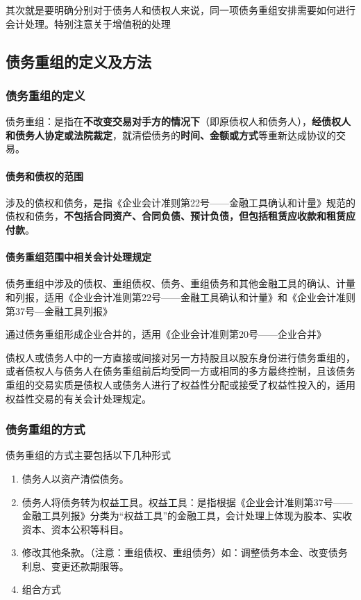 \documentclass[UTF8,12pt]{ctexart}
\numberwithin{equation}{section} %
\numberwithin{figure}{section}
\numberwithin{table}{section}
\begin{document}
	其次就是要明确分别对于债务人和债权人来说，同一项债务重组安排需要如何进行会计处理。特别注意关于增值税的处理
	
	\subsection{债务重组的定义及方法}
	\subsubsection{债务重组的定义}
	债务重组：是指在\textbf{不改变交易对手方的情况下}（即原债权人和债务人），\textbf{经债权人和债务人协定或法院裁定}，就清偿债务的\textbf{时间、金额或方式}等重新达成协议的交易。
	
	\paragraph{债务和债权的范围}
	涉及的债权和债务，是指《企业会计准则第22号——金融工具确认和计量》规范的债权和债务，\textbf{不包括合同资产、合同负债、预计负债，但包括租赁应收款和租赁应付款}。
	
	\paragraph{债务重组范围中相关会计处理规定}
	
	债务重组中涉及的债权、重组债权、债务、重组债务和其他金融工具的确认、计量和列报，适用《企业会计准则第22号——金融工具确认和计量》和《企业会计准则第37号—金融工具列报》
	
	通过债务重组形成企业合并的，适用《企业会计准则第20号——企业合并》
	
	债权人或债务人中的一方直接或间接对另一方持股且以股东身份进行债务重组的，或者债权人与债务人在债务重组前后均受同一方或相同的多方最终控制，且该债务重组的交易实质是债权人或债务人进行了权益性分配或接受了权益性投入的，适用权益性交易的有关会计处理规定。
	\subsubsection{债务重组的方式}
	债务重组的方式主要包括以下几种形式
	\begin{enumerate}
		\item 债务人以资产清偿债务。
		
		\item 债务人将债务转为权益工具。权益工具：是指根据《企业会计准则第37号——金融工具列报》分类为“权益工具”的金融工具，会计处理上体现为股本、实收资本、资本公积等科目。
		
		\item 修改其他条款。（注意：重组债权、重组债务）如：调整债务本金、改变债务利息、变更还款期限等。
		
		\item 组合方式
	\end{enumerate}
	
\end{document}
